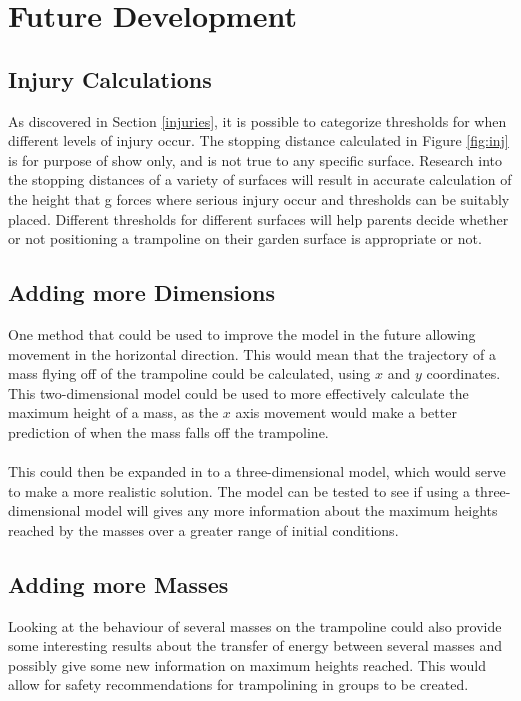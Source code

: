 \section{Future Development}\label{future}

\subsection{Injury Calculations}\label{futureinjury}


\noindent As discovered in Section \ref{injuries}, it is possible to categorize thresholds for when different levels of injury occur. The stopping distance calculated in Figure \ref{fig:inj} is for purpose of show only, and is not true to any specific surface. Research into the stopping distances of a variety of surfaces will result in accurate calculation of the height that g forces where serious injury occur and thresholds can be suitably placed. Different thresholds for different surfaces will help parents decide whether or not positioning a trampoline on their garden surface is appropriate or not.

\subsection{Adding more Dimensions}\label{dimensions}

One method that could be used to improve the model in the future allowing movement in the horizontal direction. This would mean that the trajectory of a mass flying off of the trampoline could be calculated, using $x$ and $y$ coordinates. This two-dimensional model could be used to more effectively calculate the maximum height of a mass, as the $x$ axis movement would make a better prediction of when the mass falls off the trampoline. 
\\
\\
This could then be expanded in to a three-dimensional model, which would serve to make a more realistic solution. The model can be tested to see if using a three-dimensional model will gives any more information about the maximum heights reached by the masses over a greater range of initial conditions.

\subsection{Adding more Masses}
Looking at the behaviour of several masses on the trampoline could also provide some interesting results about the transfer of energy between several masses and possibly give some new information on maximum heights reached. This would allow for safety recommendations for trampolining in groups to be created.


